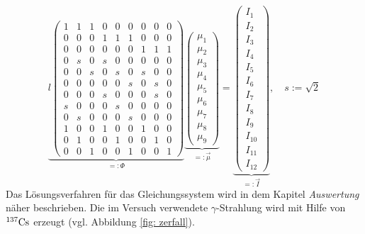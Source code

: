 \begin{equation}
  \label{eq: matrix_absoprtionskoeffizienten}
  \underbrace{ l\begin{pmatrix} 1 & 1 & 1 & 0 & 0 & 0 & 0 & 0 & 0 \\ 0 & 0 & 0 & 1 & 1 & 1 & 0 & 0 & 0 \\ 0 & 0 & 0 & 0 & 0 & 0 & 1 & 1 & 1 \\ 0 & s & 0 & s & 0 & 0 & 0 & 0 & 0 \\ 0 & 0 & s & 0 & s & 0 & s & 0 & 0 \\ 0 & 0 & 0 & 0 & 0 & s & 0 & s & 0 \\ 0 & 0 & 0 & s & 0 & 0 & 0 & s & 0 \\ s & 0 & 0 & 0 & s & 0 & 0 & 0 & 0 \\ 0 & s & 0 & 0 & 0 & s & 0 & 0 & 0 \\ 1 & 0 & 0 & 1 & 0 & 0 & 1 & 0 & 0 \\ 0 & 1 & 0 & 0 & 1 & 0 & 0 & 1 & 0 \\ 0 & 0 & 1 & 0 & 0 & 1 & 0 & 0 & 1 \end{pmatrix} }_{=:\Phi}  \underbrace{ \begin{pmatrix}\mu_1 \\ \mu_2 \\ \mu_3 \\ \mu_4 \\ \mu_5 \\ \mu_6 \\ \mu_7 \\ \mu_8 \\ \mu_9 \end{pmatrix} }_{=:\vec{\mu}} = \underbrace{ \begin{pmatrix} I_1 \\ I_2 \\ I_3 \\ I_4 \\ I_5 \\ I_6 \\ I_7 \\ I_8 \\ I_9 \\ I_{10} \\ I_{11} \\ I_{12} \end{pmatrix} }_{ =:\vec{I}}, \quad s:=\sqrt{2}
\end{equation}
Das Lösungsverfahren für das Gleichungssystem wird in dem Kapitel \emph{Auswertung} näher beschrieben.
Die im Versuch verwendete $\gamma$-Strahlung wird mit Hilfe von $^{137}\ce{Cs}$ erzeugt (vgl. Abbildung \ref{fig: zerfall}).

